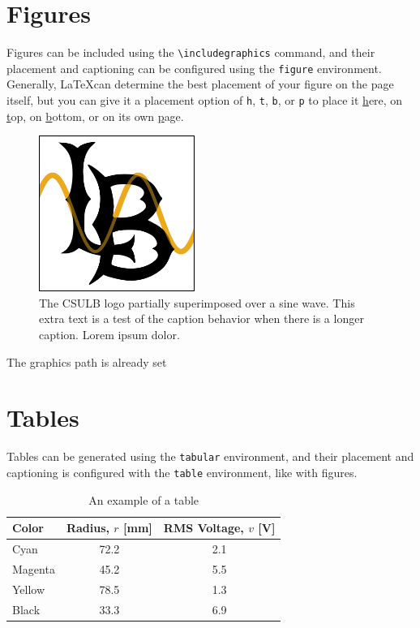 \section*{Figures}
Figures can be included using the \texttt{\textbackslash includegraphics} command, and their placement and captioning can be configured using the \texttt{figure} environment. Generally, \LaTeX can determine the best placement of your figure on the page itself, but you can give it a placement option of \texttt{h}, \texttt{t}, \texttt{b}, or \texttt{p} to place it \underline{h}ere, on \underline{t}op, on \underline{b}ottom, or on its own \underline{p}age. 

\begin{figure}[h]
	\centering
	\includegraphics[width=2in]{Figures/lb.pdf}
	\caption{The CSULB logo partially superimposed over a sine wave. This extra text is a test of the caption behavior when there is a longer caption. Lorem ipsum dolor.}
	\label{fig:exampleFig}
\end{figure}

The graphics path is already set

\section*{Tables}
Tables can be generated using the \texttt{tabular} environment, and their placement and captioning is configured with the \texttt{table} environment, like with figures.

\begin{table}
	\centering
	\caption{An example of a table}
	\begin{tabular}{l c c}
		\hline
		Color	&  Radius, $r$ [mm] & RMS Voltage, $v$ [V] \\
		\hline
		Cyan	&	72.2	&	2.1 \\
		Magenta	&	45.2	&	5.5 \\
		Yellow	&	78.5	&	1.3 \\
		Black	&	33.3	&	6.9 \\
		\hline
	\end{tabular}
	\label{tab:exampleTable}
\end{table}

